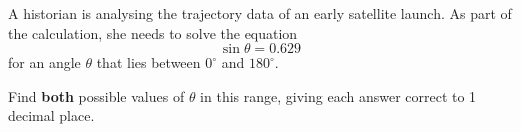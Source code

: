 \begin{question}
\noindent A historian is analysing the trajectory data of an early satellite launch. As part of the calculation, she needs to solve the equation
\[
\sin \theta = 0.629
\]
for an angle $\theta$ that lies between $0^\circ$ and $180^\circ$.

\noindent Find \textbf{both} possible values of $\theta$ in this range, giving each answer correct to 1 decimal place.

\vspace{4.5cm}

\begin{flushright}
\end{flushright}
\end{question}